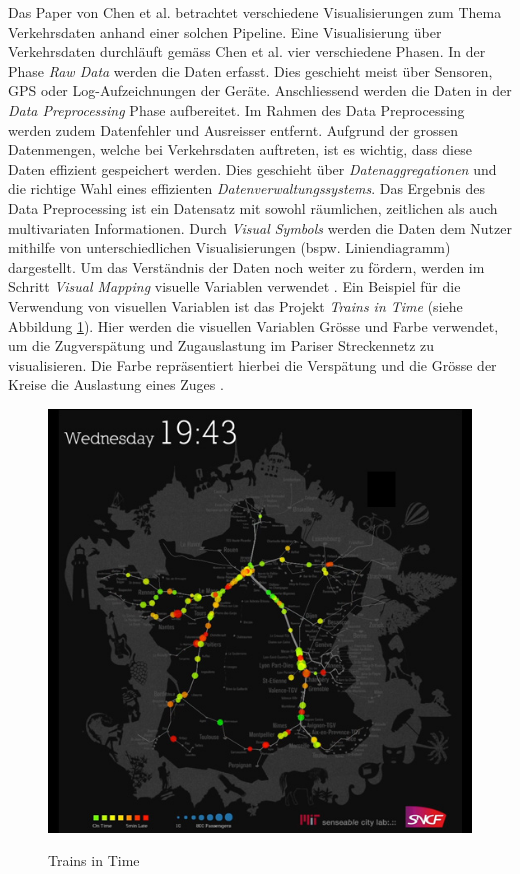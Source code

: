 Das Paper von Chen et al. betrachtet verschiedene Visualisierungen zum Thema Verkehrsdaten anhand einer solchen Pipeline. Eine Visualisierung über Verkehrsdaten durchläuft gemäss Chen et al. vier verschiedene Phasen. In der Phase \textit{Raw Data} werden die Daten erfasst. Dies geschieht meist über Sensoren, GPS oder Log-Aufzeichnungen der Geräte. Anschliessend werden die Daten in der \textit{Data Preprocessing} Phase aufbereitet. Im Rahmen des Data Preprocessing werden zudem Datenfehler und Ausreisser entfernt. Aufgrund der grossen Datenmengen, welche bei Verkehrsdaten auftreten, ist es wichtig, dass diese Daten effizient gespeichert werden. Dies geschieht über \textit{Datenaggregationen} und die richtige Wahl eines effizienten \textit{Datenverwaltungssystems}. Das Ergebnis des Data Preprocessing ist ein Datensatz mit sowohl räumlichen, zeitlichen als auch multivariaten Informationen. Durch \textit{Visual Symbols} werden die Daten dem Nutzer mithilfe von unterschiedlichen Visualisierungen (bspw. Liniendiagramm) dargestellt. Um das Verständnis der Daten noch weiter zu fördern, werden im Schritt \textit{Visual Mapping} visuelle Variablen verwendet \parencite[S.2971]{survey_traffic_data_visualization_2015}. Ein Beispiel für die Verwendung von visuellen Variablen ist das Projekt \textit{Trains in Time} (siehe Abbildung \ref{fig_trains_in_time}). Hier werden die visuellen Variablen Grösse und Farbe verwendet, um die Zugverspätung und Zugauslastung im Pariser Streckennetz zu visualisieren. Die Farbe repräsentiert hierbei die Verspätung und die Grösse der Kreise die Auslastung eines Zuges \parencite{trains_of_data_2012}.   

\begin{figure}[H]
    \caption{Trains in Time \parencite{trains_of_data_2012}}
    \includegraphics[width=.5\linewidth]{content/00_assets/trains_in_time.jpg}
    \label{fig_trains_in_time}
\end{figure}

